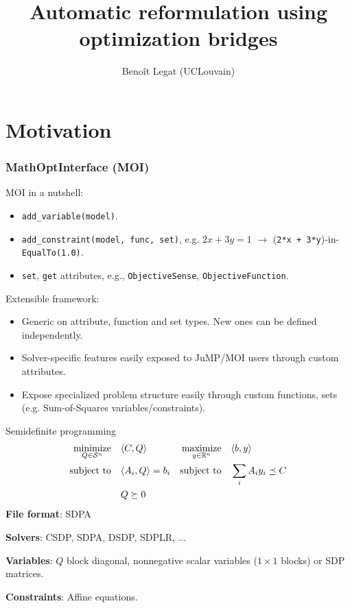 \documentclass{beamer}
\title{Automatic reformulation using optimization bridges}
\author{Beno\^it Legat (UCLouvain)}
\institute{Los Alamos National Laboratory, 16th July 2019}
\begin{document}
  \maketitle

  \begin{frame}
    \tableofcontents
  \end{frame}

\section{Motivation}

  \begin{frame}[fragile]
    \frametitle{MathOptInterface (MOI)}
    MOI in a nutshell:
    \begin{itemize}
      \item \verb|add_variable(model)|.
      \item \verb|add_constraint(model, func, set)|, e.g. $2x + 3y = 1$ $\to$ (\verb|2*x + 3*y|)-in-\verb|EqualTo(1.0)|.
      \item \verb|set|, \verb|get| attributes, e.g., \verb|ObjectiveSense|, \verb|ObjectiveFunction|.
    \end{itemize}
    Extensible framework:
    \begin{itemize}
      \item \alert{Generic} on attribute, function and set types. New ones can be defined \alert{independently}.
      \item Solver-\alert{specific} features easily exposed to JuMP/MOI users through \alert{custom} attributes.
      \item Expose \alert{specialized} problem structure easily through \alert{custom} functions, sets (e.g. Sum-of-Squares variables/constraints).
    \end{itemize}
  \end{frame}

  \begin{frame}{Semidefinite programming}
    \begin{align*}
      \operatorname*{minimize}_{Q \in \mathcal{S}^{n}} \quad & \langle C, Q \rangle & \operatorname*{maximize}_{y \in \mathbb{R}^n} \quad & \langle b, y \rangle\\
      \operatorname*{\operatorname*{\text{subject to}}\quad} & \langle A_i, Q \rangle = b_i & \operatorname*{\operatorname*{\text{subject to}}\quad} & \sum_i A_i y_i \preceq C\\
        & Q \succeq 0
    \end{align*}
    \textbf{File format}: SDPA

    \textbf{Solvers}: CSDP, SDPA, DSDP, SDPLR, ...

    \textbf{Variables}: $Q$ block diagonal, nonnegative scalar variables ($1 \times 1$ blocks) or SDP matrices.

    \textbf{Constraints}: Affine equations.
  \end{frame}
\end{document}
